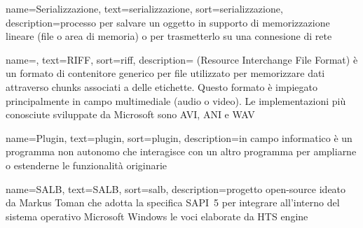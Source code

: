 {
	name=Serializzazione,
	text=serializzazione,
	sort=serializzazione,
	description={processo per salvare un oggetto in supporto di memorizzazione lineare (file o area di memoria) o per trasmetterlo su una connesione di rete}
}

{
	name=,
	text=RIFF,
	sort=riff,
	description={ (Resource Interchange File Format) è un formato di contenitore generico per file utilizzato per memorizzare dati attraverso chunks associati a delle etichette. Questo formato è impiegato principalmente in campo multimediale (audio o video). Le implementazioni più conosciute sviluppate da Microsoft sono AVI, ANI e WAV}
}

{
	name=Plugin,
	text=plugin,
	sort=plugin,
	description={in campo informatico è un programma non autonomo che interagisce con un altro programma per ampliarne o estenderne le funzionalità originarie}
}

{
	name=SALB,
	text=SALB,
	sort=salb,
	description={progetto open-source ideato da Markus Toman che adotta la specifica SAPI~5 per integrare all'interno del sistema operativo Microsoft Windows le voci elaborate da HTS engine}
}

